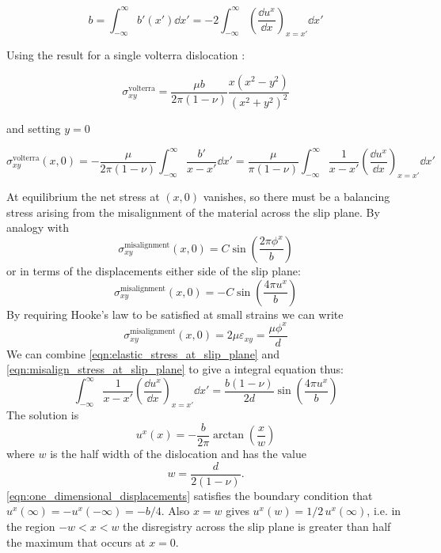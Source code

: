 \begin{equation}
b = \int_{-\infty}^{\infty} b'(x') \dd x' = -2\int^{\infty}_{-\infty} \left( \! \frac{\dd u^x}{\dd x} \right)_{x=x'} \dd x' 
\end{equation}

Using the result for a single volterra dislocation \cite{hirth_lothe_1982_volterra_stress_field}:

\begin{equation}
\sigma^{\text{volterra}}_{xy} = \frac{\mu b}{2\pi (1-\nu)} \frac{x(x^2 - y^2)}{(x^2+y^2)^2}
\end{equation}

and setting $y=0$

\begin{equation}
\sigma^{\text{volterra}}_{xy}(x,0) = -\frac{\mu}{2\pi(1-\nu)} \int^{\infty}_{-\infty} \frac{b'}{x-x'} \!\dd x' =  \frac{\mu}{\pi(1-\nu)} \int^{\infty}_{-\infty} \frac{1}{x-x'} \left(\!\frac{\dd u^x}{\dd x}\right)_{x=x'} \!\dd x'
\label{eqn:elastic_stress_at_slip_plane}
\end{equation}

At equilibrium the net stress at $(x,0)$ vanishes, so there must be a balancing stress arising from the misalignment of the material across the slip plane. By analogy with \citet{Frenkel1926}
\begin{equation}
\sigma_{xy}^{\text{misalignment}}(x,0) = C \sin \left( \frac{2\pi \phi^x}{b} \right)
\end{equation}
or in terms of the displacements either side of the slip plane:
\begin{equation}
\sigma_{xy}^{\text{misalignment}}(x,0) = -C \sin \left( \frac{4\pi u^x}{b} \right)
\end{equation}
By requiring Hooke's law to be satisfied at small strains we can write
\begin{equation}
\sigma_{xy}^{\text{misalignment}}(x,0) = 2 \mu \varepsilon_{xy} = \frac{\mu{}\phi^x}{d}
\label{eqn:misalign_stress_at_slip_plane}
\end{equation}
We can combine \autoref{eqn:elastic_stress_at_slip_plane} and \autoref{eqn:misalign_stress_at_slip_plane} to give a integral equation thus:
\begin{equation}
\int^{\infty}_{-\infty} \frac{1}{x-x'} \left(\!\frac{\dd u^x}{\dd x}\right)_{x=x'} \dd x' = \frac{b(1-\nu)}{2d} \sin\left(\frac{4\pi{}u^x}{b}\right)
\end{equation}
The solution is \cite{hirth_lothe1982peierls_displacements,Eshelby1949}
\begin{equation}
u^x(x) = -\frac{b}{2\pi} \arctan \left( \frac{x}{w} \right)
\label{eqn:one_dimensional_displacements}
\end{equation}
where $w$ is the half width of the dislocation and has the value
\begin{equation}
w = \frac{d}{2(1-\nu)}.\label{eqn:half_width}
\end{equation}
\autoref{eqn:one_dimensional_displacements} satisfies the boundary condition that $u^x(\infty) = - u^x(-\infty) = -b/4$. Also $x=w$ gives $u^x(w)=1/2\, u^x(\infty)$, i.e. in the region $-w < x < w$ the disregistry across the slip plane is greater than half the maximum that occurs at $x=0$.

